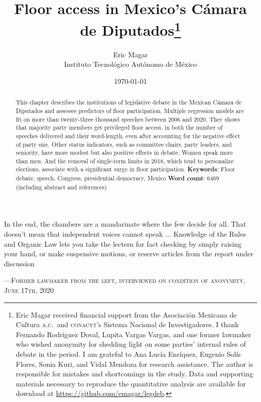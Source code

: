 \documentclass[letter,12pt]{article}
\begin{document}
\title{Floor access in Mexico's Cámara de Diputados\thanks{Eric Magar received financial support from the Asociaci\'on Mexicana de Cultura \textsc{a.c.}\ and \textsc{conacyt}'s Sistema Nacional de Investigadores. I thank Fernando Rodríguez Doval, Lupita Vargas Vargas, and one former lawmaker who wished anonymity for shedding light on some parties' internal rules of debate in the period. I am grateful to Ana Lucía Enríquez, Eugenio Solís Flores, Sonia Kuri, and Vidal Mendoza for research assistance. The author is responsible for mistakes and shortcomings in the study. Data and supporting materials necessary to reproduce the quantitative analysis are available for download at \url{https://github.com/emagar/legdeb}.}}
\author{Eric Magar \\ Instituto Tecnológico Autónomo de México}
\date{\today}
\maketitle


\begin{abstract}
\noindent This chapter describes the institutions of legislative debate in the Mexican Cámara de Diputados and assesses predictors of floor participation. Multiple regression models are fit on more than twenty-three thousand speeches between 2006 and 2020. They shows that majority party members get privileged floor access, in both the number of speeches delivered and their word-length, even after accounting for the negative effect of party size. Other status indicators, such as committee chairs, party leaders, and seniority, have more modest but also positive effects in debate. Women speak more than men. And the removal of single-term limits in 2018, which tend to personalize elections, associate with a significant surge in floor participation. 
\newline
\newline
\textbf{Keywords}: Floor debate, speech, Congress, presidential democracy, Mexico
\newline
\newline
\textbf{Word count}: 6469 (including abstract and references)
\end{abstract}

\newpage

\singlespacing
\epigraph{In the end, the chambers are a mandarinate where the few decide for all. That doesn't mean that independent voices cannot speak ... Knowledge of the Rules and Organic Law lets you take the lectern for fact checking by simply raising your hand, or make suspensive motions, or reserve articles from the report under discussion}%
{---\textsc{Former lawmaker from the left, interviewed on condition of anonymity, June 17th, 2020}}
\doublespacing
\end{document}
